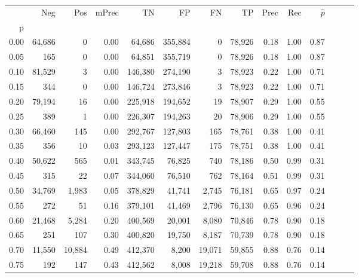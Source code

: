 \begin{tabular}{rrrrrrrrrrrrrr}
\toprule
{} &     Neg &     Pos & mPrec &       TN &       FP &      FN &      TP &  Prec &   Rec & $\hat{p}$ \\
p    &         &         &       &          &          &         &         &       &       &           \\
\midrule
0.00 &  64,686 &       0 &  0.00 &   64,686 &  355,884 &       0 &  78,926 &  0.18 &  1.00 &      0.87 \\
0.05 &     165 &       0 &  0.00 &   64,851 &  355,719 &       0 &  78,926 &  0.18 &  1.00 &      0.87 \\
0.10 &  81,529 &       3 &  0.00 &  146,380 &  274,190 &       3 &  78,923 &  0.22 &  1.00 &      0.71 \\
0.15 &     344 &       0 &  0.00 &  146,724 &  273,846 &       3 &  78,923 &  0.22 &  1.00 &      0.71 \\
0.20 &  79,194 &      16 &  0.00 &  225,918 &  194,652 &      19 &  78,907 &  0.29 &  1.00 &      0.55 \\
0.25 &     389 &       1 &  0.00 &  226,307 &  194,263 &      20 &  78,906 &  0.29 &  1.00 &      0.55 \\
0.30 &  66,460 &     145 &  0.00 &  292,767 &  127,803 &     165 &  78,761 &  0.38 &  1.00 &      0.41 \\
0.35 &     356 &      10 &  0.03 &  293,123 &  127,447 &     175 &  78,751 &  0.38 &  1.00 &      0.41 \\
0.40 &  50,622 &     565 &  0.01 &  343,745 &   76,825 &     740 &  78,186 &  0.50 &  0.99 &      0.31 \\
0.45 &     315 &      22 &  0.07 &  344,060 &   76,510 &     762 &  78,164 &  0.51 &  0.99 &      0.31 \\
0.50 &  34,769 &   1,983 &  0.05 &  378,829 &   41,741 &   2,745 &  76,181 &  0.65 &  0.97 &      0.24 \\
0.55 &     272 &      51 &  0.16 &  379,101 &   41,469 &   2,796 &  76,130 &  0.65 &  0.96 &      0.24 \\
0.60 &  21,468 &   5,284 &  0.20 &  400,569 &   20,001 &   8,080 &  70,846 &  0.78 &  0.90 &      0.18 \\
0.65 &     251 &     107 &  0.30 &  400,820 &   19,750 &   8,187 &  70,739 &  0.78 &  0.90 &      0.18 \\
0.70 &  11,550 &  10,884 &  0.49 &  412,370 &    8,200 &  19,071 &  59,855 &  0.88 &  0.76 &      0.14 \\
0.75 &     192 &     147 &  0.43 &  412,562 &    8,008 &  19,218 &  59,708 &  0.88 &  0.76 &      0.14 \\

\end{tabular}
